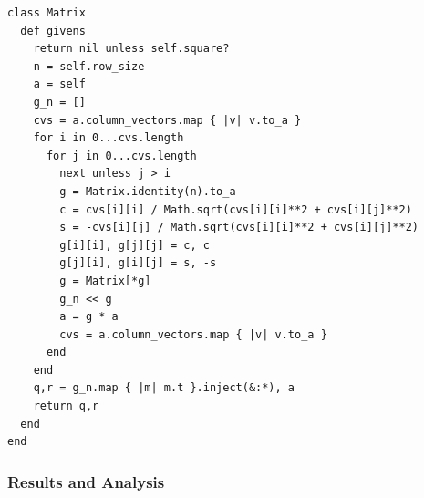 \documentclass[letterpaper,12pt]{article}
\begin{document}
\lstset{caption=QR Decomposition via Givens Rotations}
\begin{lstlisting}
class Matrix
  def givens
    return nil unless self.square?
    n = self.row_size
    a = self
    g_n = []
    cvs = a.column_vectors.map { |v| v.to_a }
    for i in 0...cvs.length
      for j in 0...cvs.length
        next unless j > i
        g = Matrix.identity(n).to_a
        c = cvs[i][i] / Math.sqrt(cvs[i][i]**2 + cvs[i][j]**2)
        s = -cvs[i][j] / Math.sqrt(cvs[i][i]**2 + cvs[i][j]**2)
        g[i][i], g[j][j] = c, c
        g[j][i], g[i][j] = s, -s
        g = Matrix[*g]
        g_n << g
        a = g * a
        cvs = a.column_vectors.map { |v| v.to_a }
      end
    end
    q,r = g_n.map { |m| m.t }.inject(&:*), a
    return q,r
  end
end
\end{lstlisting}

\subsubsection{Results and Analysis}
\end{document}
